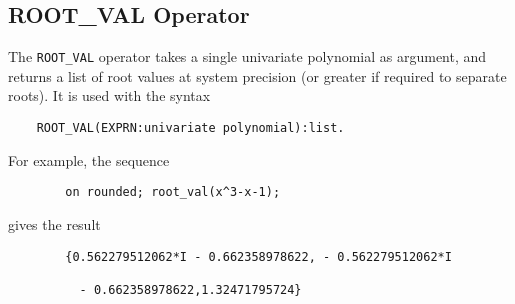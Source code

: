\subsection{ROOT\_VAL Operator}

The {\tt ROOT\_VAL} operator takes a single univariate polynomial as
argument, and returns a list of root values at system precision (or
greater if required to separate roots).  It is used with the syntax
\begin{verbatim}
	ROOT_VAL(EXPRN:univariate polynomial):list.
\end{verbatim}
For example, the sequence
\begin{verbatim}
        on rounded; root_val(x^3-x-1);
\end{verbatim}
gives the result
\begin{verbatim}
        {0.562279512062*I - 0.662358978622, - 0.562279512062*I

          - 0.662358978622,1.32471795724}
\end{verbatim}
